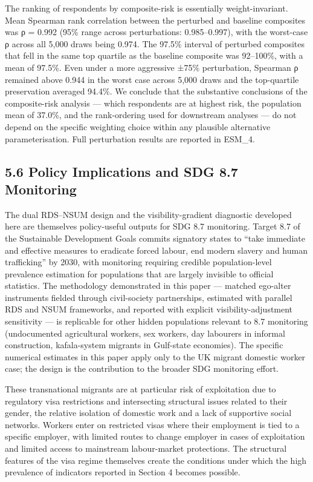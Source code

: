 \documentclass[
  12pt,
  letterpaper,
  DIV=11,
  numbers=noendperiod]{scrartcl}
\begin{document}
The ranking of respondents by composite-risk is essentially
weight-invariant. Mean Spearman rank correlation between the perturbed
and baseline composites was ρ = 0.992 (95\% range across perturbations:
0.985--0.997), with the worst-case ρ across all 5,000 draws being 0.974.
The 97.5\% interval of perturbed composites that fell in the same top
quartile as the baseline composite was 92--100\%, with a mean of 97.5\%.
Even under a more aggressive ±75\% perturbation, Spearman ρ remained
above 0.944 in the worst case across 5,000 draws and the top-quartile
preservation averaged 94.4\%. We conclude that the substantive
conclusions of the composite-risk analysis --- which respondents are at
highest risk, the population mean of 37.0\%, and the rank-ordering used
for downstream analyses --- do not depend on the specific weighting
choice within any plausible alternative parameterisation. Full
perturbation results are reported in ESM\_4.

\subsection{5.6 Policy Implications and SDG 8.7
Monitoring}\label{policy-implications-and-sdg-8.7-monitoring}

The dual RDS--NSUM design and the visibility-gradient diagnostic
developed here are themselves policy-useful outputs for SDG 8.7
monitoring. Target 8.7 of the Sustainable Development Goals commits
signatory states to ``take immediate and effective measures to eradicate
forced labour, end modern slavery and human trafficking'' by 2030, with
monitoring requiring credible population-level prevalence estimation for
populations that are largely invisible to official statistics. The
methodology demonstrated in this paper --- matched ego-alter instruments
fielded through civil-society partnerships, estimated with parallel RDS
and NSUM frameworks, and reported with explicit visibility-adjustment
sensitivity --- is replicable for other hidden populations relevant to
8.7 monitoring (undocumented agricultural workers, sex workers, day
labourers in informal construction, kafala-system migrants in Gulf-state
economies). The specific numerical estimates in this paper apply only to
the UK migrant domestic worker case; the design is the contribution to
the broader SDG monitoring effort.

These transnational migrants are at particular risk of exploitation due
to regulatory visa restrictions and intersecting structural issues
related to their gender, the relative isolation of domestic work and a
lack of supportive social networks. Workers enter on restricted visas
where their employment is tied to a specific employer, with limited
routes to change employer in cases of exploitation and limited access to
mainstream labour-market protections. The structural features of the
visa regime themselves create the conditions under which the high
prevalence of indicators reported in Section 4 becomes possible.
\end{document}
